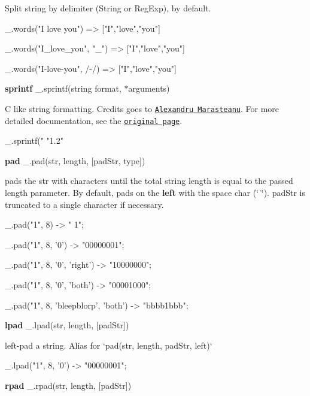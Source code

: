 Split string by delimiter (String or Reg\+Exp), \textquotesingle{} \textquotesingle{} by default.


\begin{DoxyCode}
\_.words("I love you")
=> ["I","love","you"]

\_.words("I\_love\_you", "\_")
=> ["I","love","you"]

\_.words("I-love-you", /-/)
=> ["I","love","you"]
\end{DoxyCode}


{\bfseries sprintf} \+\_\+.\+sprintf(string format, $\ast$arguments)

C like string formatting. Credits goes to \href{http://www.diveintojavascript.com/projects/sprintf-for-javascript}{\tt Alexandru Marasteanu}. For more detailed documentation, see the \href{http://www.diveintojavascript.com/projects/sprintf-for-javascript}{\tt original page}.


\begin{DoxyCode}
\_.sprintf("%
"1.2"
\end{DoxyCode}


{\bfseries pad} \+\_\+.\+pad(str, length, \mbox{[}pad\+Str, type\mbox{]})

pads the {\ttfamily str} with characters until the total string length is equal to the passed {\ttfamily length} parameter. By default, pads on the {\bfseries left} with the space char ({\ttfamily \char`\"{} \char`\"{}}). {\ttfamily pad\+Str} is truncated to a single character if necessary.


\begin{DoxyCode}
\_.pad("1", 8)
-> "       1";

\_.pad("1", 8, '0')
-> "00000001";

\_.pad("1", 8, '0', 'right')
-> "10000000";

\_.pad("1", 8, '0', 'both')
-> "00001000";

\_.pad("1", 8, 'bleepblorp', 'both')
-> "bbbb1bbb";
\end{DoxyCode}


{\bfseries lpad} \+\_\+.\+lpad(str, length, \mbox{[}pad\+Str\mbox{]})

left-\/pad a string. Alias for `pad(str, length, pad\+Str, \textquotesingle{}left\textquotesingle{})`


\begin{DoxyCode}
\_.lpad("1", 8, '0')
-> "00000001";
\end{DoxyCode}


{\bfseries rpad} \+\_\+.\+rpad(str, length, \mbox{[}pad\+Str\mbox{]})


